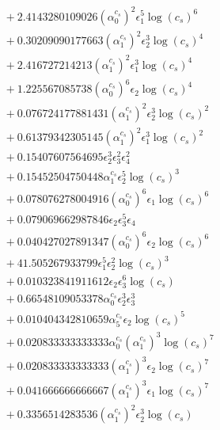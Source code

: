 \documentclass[10pt]{article}
\begin{document}
\begin{align*}
&{}  + 2.4143280109026 \left(\alpha_{0}^{c_s}\right)^{2} \epsilon_{1}^{5} \log{\left(c_{s} \right)}^{6} \\
&{}  + 0.30209090177663 \left(\alpha_{1}^{c_s}\right)^{2} \epsilon_{2}^{3} \log{\left(c_{s} \right)}^{4} \\
&{}  + 2.416727214213 \left(\alpha_{1}^{c_s}\right)^{2} \epsilon_{1}^{3} \log{\left(c_{s} \right)}^{4} \\
&{}  + 1.225567085738 \left(\alpha_{0}^{c_s}\right)^{6} \epsilon_{2} \log{\left(c_{s} \right)}^{4} \\
&{}  + 0.076724177881431 \left(\alpha_{1}^{c_s}\right)^{2} \epsilon_{2}^{3} \log{\left(c_{s} \right)}^{2} \\
&{}  + 0.61379342305145 \left(\alpha_{1}^{c_s}\right)^{2} \epsilon_{1}^{3} \log{\left(c_{s} \right)}^{2} \\
&{}  + 0.15407607564695 \epsilon_{2}^{3} \epsilon_{3}^{2} \epsilon_{4}^{2} \\
&{}  + 0.15452504750448 \alpha_{1}^{c_s} \epsilon_{2}^{5} \log{\left(c_{s} \right)}^{3} \\
&{}  + 0.078076278004916 \left(\alpha_{0}^{c_s}\right)^{6} \epsilon_{1} \log{\left(c_{s} \right)}^{6} \\
&{}  + 0.079069662987846 \epsilon_{2} \epsilon_{3}^{5} \epsilon_{4} \\
&{}  + 0.040427027891347 \left(\alpha_{0}^{c_s}\right)^{6} \epsilon_{2} \log{\left(c_{s} \right)}^{6} \\
&{}  + 41.505267933799 \epsilon_{1}^{5} \epsilon_{2}^{2} \log{\left(c_{s} \right)}^{3} \\
&{}  + 0.010323841911612 \epsilon_{2} \epsilon_{3}^{6} \log{\left(c_{s} \right)} \\
&{}  + 0.66548109053378 \alpha_{0}^{c_s} \epsilon_{2}^{3} \epsilon_{3}^{3} \\
&{}  + 0.010404342810659 \alpha_{5}^{c_s} \epsilon_{2} \log{\left(c_{s} \right)}^{5} \\
&{}  + 0.020833333333333 \alpha_{0}^{c_s} \left(\alpha_{1}^{c_s}\right)^{3} \log{\left(c_{s} \right)}^{7} \\
&{}  + 0.020833333333333 \left(\alpha_{1}^{c_s}\right)^{3} \epsilon_{2} \log{\left(c_{s} \right)}^{7} \\
&{}  + 0.041666666666667 \left(\alpha_{1}^{c_s}\right)^{3} \epsilon_{1} \log{\left(c_{s} \right)}^{7} \\
&{}  + 0.3356514283536 \left(\alpha_{1}^{c_s}\right)^{2} \epsilon_{2}^{3} \log{\left(c_{s} \right)} \\

\end{align*}
\end{document}
